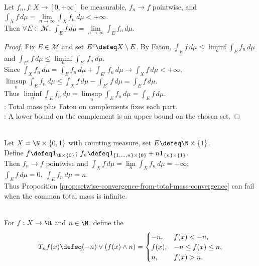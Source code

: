 \begin{proposition} \label{prop:setwise-convergence-from-total-mass-convergence} \\
Let $f_n,f:X\to[0,+\infty]$ be measurable, $f_n\to f$ pointwise, and $\int_X f\,d\mu=\lim\limits_{n\to\infty}\int_X f_n\,d\mu<+\infty$.\\
Then $\forall E\in\mathcal{M}$, $\int_E f\,d\mu=\lim\limits_{n\to\infty}\int_E f_n\,d\mu$.
\begin{proof}
Fix $E\in\mathcal{M}$ and set $E^c\defeq X\setminus E$. By Fatou, $\int_Ef\,d\mu\leq\liminf\limits_n\int_Ef_n\,d\mu$ and $\int_{E^c}f\,d\mu\leq\liminf\limits_n\int_{E^c}f_n\,d\mu$.\\
Since $\int_X f_n\,d\mu=\int_E f_n\,d\mu+\int_{E^c}f_n\,d\mu\to\int_Xf\,d\mu<+\infty$, $\limsup\limits_n\int_Ef_n\,d\mu\leq\int_Xf\,d\mu-\int_{E^c}f\,d\mu=\int_Ef\,d\mu$.\\
Thus $\liminf\limits_n\int_Ef_n\,d\mu=\limsup\limits_n\int_Ef_n\,d\mu=\int_Ef\,d\mu$.\\
: Total mass plus Fatou on complements fixes each part.\\
: A lower bound on the complement is an upper bound on the chosen set.
\end{proof}
\end{proposition}

\begin{example} \label{ex:setwise-convergence-needs-finite-total-mass} \\
Let $X=\N\times\{0,1\}$ with counting measure, set $E\defeq\N\times\{1\}$.\\
Define $f\defeq\mathbf{1}_{\N\times\{0\}}$; $f_n\defeq\mathbf{1}_{\{1,\ldots,n\}\times\{0\}}+n\mathbf{1}_{\{n\}\times\{1\}}$.\\
Then $f_n\to f$ pointwise and $\int_Xf\,d\mu=\lim\limits_n\int_Xf_n\,d\mu=+\infty$; $\int_Ef\,d\mu=0,\; \int_Ef_n\,d\mu=n$.\\
Thus Proposition \ref{prop:setwise-convergence-from-total-mass-convergence} can fail when the common total mass is infinite.
\end{example}

\begin{definition} \label{def:function-truncates} \\
For $f:X\to\R$ and $n\in\N$, define the 
\begin{equation*}
T_nf(x)\defeq (-n)\vee(f(x)\wedge n)=
\begin{cases}
-n,&f(x)<-n,\\
f(x),&-n\leq f(x)\leq n,\\
n,&f(x)>n.
\end{cases}
\end{equation*}
\end{definition}

